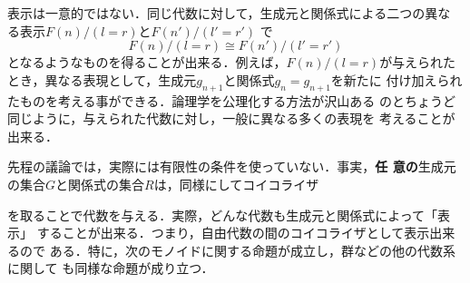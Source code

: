 \begin{warn}
 表示は一意的ではない．同じ代数に対して，生成元と関係式による二つの異な
 る表示$F(n)/(l = r)$と$F(n')/(l' = r')$ で
 \[
  F(n)/(l = r) \cong F(n')/(l' = r')
 \]
 となるようなものを得ることが出来る．例えば，$F(n)/(l = r)$が与えられた
 とき，異なる表現として，生成元$g_{n+1}$と関係式$g_n = g_{n+1}$を新たに
 付け加えられたものを考える事ができる．論理学を公理化する方法が沢山ある
 のとちょうど同じように，与えられた代数に対し，一般に異なる多くの表現を
 考えることが出来る．
\end{warn}

先程の議論では，実際には有限性の条件を使っていない．事実，{\bfseries 任
意の}生成元の集合$G$と関係式の集合$R$は，同様にしてコイコライザ
\begin{center}
\end{center}
を取ることで代数を与える．実際，どんな代数も生成元と関係式によって「表示」
することが出来る．つまり，自由代数の間のコイコライザとして表示出来るので
ある．特に，次のモノイドに関する命題が成立し，群などの他の代数系に関して
も同様な命題が成り立つ．

